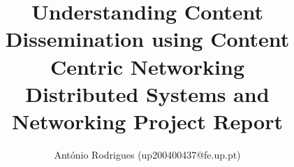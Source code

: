 \documentclass[a4paper,10pt]{report}
\begin{document}
\title{\textbf{Understanding Content Dissemination using Content Centric 
Networking} \\ {\large Distributed Systems and Networking Project Report}}
\author{António Rodrigues (up200400437@fe.up.pt)}
\maketitle
\tableofcontents





%


\appendix


\end{document}
